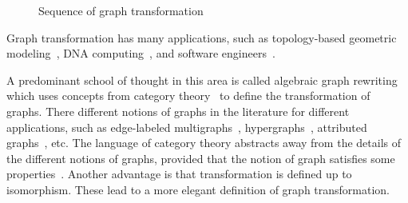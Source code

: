 \begin{figure}[hbtp]
{
}
        \caption{Sequence of graph transformation}
        \label{fig:intro_sequence_of_transformation}
    \end{figure}

 Graph transformation has many applications, such as topology-based geometric modeling~\cite{poudret2007topology, belhaouari2014jerboa, bellet2017geometric, pascale2022Geometric_modeling}, DNA computing~\cite{harju2004tutorial_dna_computation}, and software engineers~\cite{heckel2020software_engineers}.
 
 A predominant school of thought in this area is called algebraic graph rewriting~\cite{ehrig1997handbook1,ehrig1999handbook2,ehrig1999handbook3} which uses concepts from category theory~\cite{pierce1991basic,barr1990category,maclane2013categories} to define the transformation of graphs. There different notions of graphs in the literature for different applications, such as edge-labeled multigraphs~\cite{konig2018atutorial,corradini1997algebraic}, hypergraphs~\cite{plump1993hypergraph}, attributed graphs~\cite{ehrig2006fundamentals}, etc. 
 The language of category theory abstracts away from the details of the different notions of graphs, provided that the notion of graph satisfies some properties~\cite{lack2004adhesive,overbeek2023graph}. 
 Another advantage is that transformation is defined up to isomorphism. 
 These lead to a more elegant definition of graph transformation.

